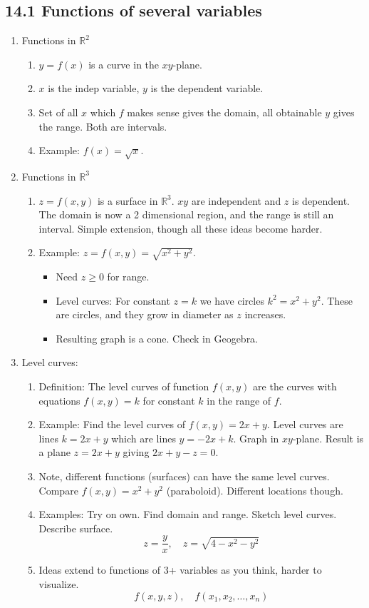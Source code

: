 \documentclass{article}
\begin{document}
\subsection{14.1 Functions of several variables}
\begin{enumerate}
\item Functions in $\mathbb{R}^2$
\begin{enumerate}
\item $y=f(x)$ is a curve in the $xy$-plane. 
\item $x$ is the indep variable, $y$ is the dependent variable. 
\item Set of all $x$ which $f$ makes sense gives the domain, all obtainable $y$ gives the range. Both are intervals.
\item Example: $f(x) = \sqrt{x}$.
\end{enumerate}

\item Functions in $\mathbb{R}^3$
\begin{enumerate}
\item $z=f(x,y)$ is a surface in $\mathbb{R}^3$. $xy$ are independent and $z$ is dependent. The domain is now a 2 dimensional region, and the range is still an interval. Simple extension, though all these ideas become harder.
\item Example: $z=f(x,y)=\sqrt{x^2+y^2}$.
\begin{itemize}
\item Need $z\geq 0$ for range. 
\item Level curves: For constant $z=k$ we have circles $k^2 = x^2+y^2$. These are circles, and they grow in diameter as $z$ increases. 
\item Resulting graph is a cone. Check in Geogebra.
\end{itemize}
\end{enumerate}

\item Level curves:
\begin{enumerate}
\item Definition: The level curves of function $f(x,y)$ are the curves with equations $f(x,y)=k$ for constant $k$ in the range of $f$.
\item Example: Find the level curves of $f(x,y)=2x+y$. Level curves are lines $k=2x+y$ which are lines $y=-2x+k$. Graph in $xy$-plane. Result is a plane $z=2x+y$ giving $2x+y-z=0$.
\item Note, different functions (surfaces) can have the same level curves. Compare $f(x,y)=x^2+y^2$ (paraboloid). Different locations though. 
\item Examples: Try on own. Find domain and range. Sketch level curves. Describe surface.
\[
z = \frac{y}{x}, \quad z=\sqrt{4-x^2-y^2}
\]
\item Ideas extend to functions of 3+ variables as you think, harder to visualize.
\[
f(x,y,z), \quad f(x_1, x_2, \dots, x_n)
\]
\end{enumerate}


\end{enumerate}
\end{document}

